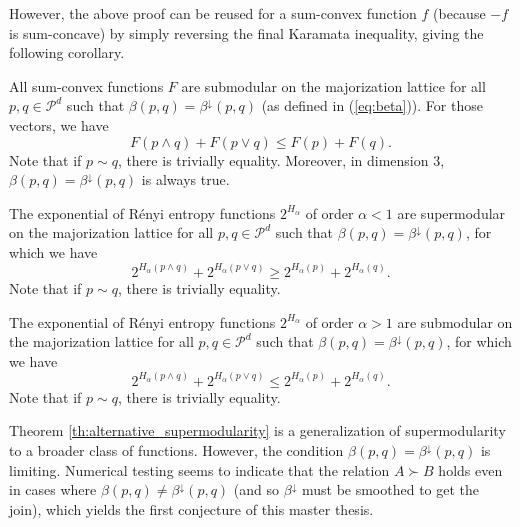However, the above proof can be reused for a sum-convex function $f$ (because $-f$ is sum-concave) by simply reversing the final Karamata inequality, giving the following corollary.

\begin{corollary} \label{cor:submodularity_sum-convex}
    All sum-convex functions $F$ are submodular on the majorization lattice for all $p, q \in \mathcal{P}^d$ such that $\beta(p, q) = \beta^\downarrow(p, q)$ (as defined in (\ref{eq:beta})). For those vectors, we have
    \begin{equation} \label{eq:submodularity}
        F(p \wedge q) + F(p \vee q) \leq F(p) + F(q).
    \end{equation}
    Note that if $p \sim q$, there is trivially equality. Moreover, in dimension 3, $\beta(p, q) = \beta^\downarrow(p, q)$ is always true.
\end{corollary}

\begin{corollary} \label{cor:renyi_leq_1}
    The exponential of Rényi entropy functions $2^{H_\alpha}$ of order $\alpha < 1$ are supermodular on the majorization lattice for all $p, q \in \mathcal{P}^d$ such that $\beta(p, q) = \beta^\downarrow(p, q)$, for which we have
    \begin{equation} \label{eq:supermodularity_renyi}
        2^{H_\alpha(p \wedge q)} + 2^{H_\alpha(p \vee q)} \geq 2^{H_\alpha(p)} + 2^{H_\alpha(q)}.
    \end{equation}
    Note that if $p \sim q$, there is trivially equality.
\end{corollary}

\begin{corollary} \label{cor:renyi_geq_1}
    The exponential of Rényi entropy functions $2^{H_\alpha}$  of order $\alpha > 1$ are submodular on the majorization lattice for all $p, q \in \mathcal{P}^d$ such that $\beta(p, q) = \beta^\downarrow(p, q)$, for which we have
    \begin{equation} \label{eq:submodularity_renyi}
        2^{H_\alpha(p \wedge q)} + 2^{H_\alpha(p \vee q)} \leq 2^{H_\alpha(p)} + 2^{H_\alpha(q)}.
    \end{equation}
    Note that if $p \sim q$, there is trivially equality.
\end{corollary}

\noindent Theorem \ref{th:alternative_supermodularity} is a generalization of supermodularity to a broader class of functions. However, the condition $\beta(p, q) = \beta^\downarrow(p, q)$ is limiting. Numerical testing seems to indicate that the relation $A \succ B$ holds even in cases where $\beta(p, q) \neq \beta^\downarrow(p, q)$ (and so $\beta^\downarrow$ must be smoothed to get the join), which yields the first conjecture of this master thesis.

